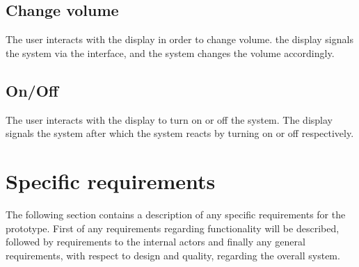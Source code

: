 \subsection{Change volume}
The user interacts with the display in order to change volume. the display signals the system via the interface, and the system changes the volume accordingly.

\subsection{On/Off}
The user interacts with the display to turn on or off the system. The display signals the system after which the system reacts by turning on or off respectively. 

\section{Specific requirements}
The following section contains a description of any specific requirements for the prototype. First of any requirements regarding functionality will be described, followed by requirements to the internal actors and finally any general requirements, with respect to design and quality, regarding the overall system.

